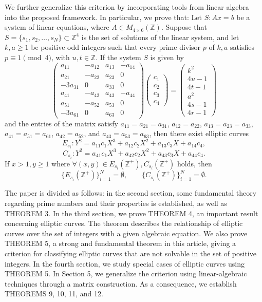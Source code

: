 \documentclass[11pt]{amsart}
\begin{document}
We further generalize this criterion by incorporating tools from linear algebra into the proposed framework. In particular, we prove that: Let $S: Ax=b$ be a system of linear equations, where $A \in M_{4\times 6}(\mathbb{Z})$. Suppose that $S=\{s_1,s_2,\dots,s_N\}\subset \mathbb{Z}^4$ is the set of solutions of the linear system, and let $k,a\ge 1$ be positive odd integers such that every prime divisor $p$ of $k,a$ satisfies $p\equiv 1 \pmod 4$, with $u,t\in\mathbb{Z}$. If the system $S$ is given by
\[
\begin{pmatrix}
a_{11} & -a_{12} & a_{13} & -a_{14} \\
a_{21} & -a_{22} & a_{23} & 0 \\
-3a_{31} & 0 & a_{33} & 0 \\
a_{41} & -a_{42} & a_{43} & -a_{44} \\
a_{51} & -a_{52} & a_{53} & 0 \\
-3a_{61} & 0 & a_{63} & 0
\end{pmatrix}
\begin{pmatrix} c_1 \\ c_2 \\ c_3 \\ c_4 \end{pmatrix}
=
\begin{pmatrix} k^2 \\ 4u-1 \\ 4t-1 \\ a^2 \\ 4s-1 \\ 4r-1 \end{pmatrix}
\]
and the entries of the matrix satisfy $a_{11}=a_{21}=a_{31}$, $a_{12}=a_{22}$, $a_{13}=a_{23}=a_{33}$, $a_{41}=a_{51}=a_{61}$, $a_{42}=a_{52}$, and $a_{43}=a_{53}=a_{63}$, then there exist elliptic curves
\[
E_{s_i}: Y^2 = a_{11}c_1X^3+a_{12}c_2X^2+a_{13}c_3X+a_{14}c_4,
\]
\[
C_{s_i}: Y^2 = a_{41}c_1X^3+a_{42}c_2X^2+a_{43}c_3X+a_{44}c_4.
\]
If $x>1,y\ge1$ where $\forall(x,y)\in E_{s_i}(\mathbb{Z}^+), C_{s_i}(\mathbb{Z}^+)$ holds, then
\[
\{E_{s_i}(\mathbb{Z}^+)\}_{i=1}^N = \emptyset, \qquad \{C_{s_i}(\mathbb{Z}^+)\}_{i=1}^N = \emptyset.
\]

The paper is divided as follows: in the second section, some fundamental theory regarding prime numbers and their properties is established, as well as THEOREM 3. In the third section, we prove THEOREM 4, an important result concerning elliptic curves. The theorem describes the relationship of elliptic curves over the set of integers with a given algebraic equation. We also prove THEOREM 5, a strong and fundamental theorem in this article, giving a criterion for classifying elliptic curves that are not solvable in the set of positive integers. In the fourth section, we study special cases of elliptic curves using THEOREM 5. In Section 5, we generalize the criterion using linear-algebraic techniques through a matrix construction. As a consequence, we establish THEOREMS 9, 10, 11, and 12.
\end{document}
